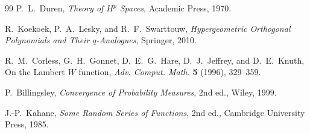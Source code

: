 \documentclass[11pt,a4paper]{article}
\theoremstyle{definition}
\theoremstyle{remark}
\begin{document}
\begin{thebibliography}{99}
P.~L.~Duren,
\emph{Theory of $H^p$ Spaces},
Academic Press, 1970.

R.~Koekoek, P.~A.~Lesky, and R.~F.~Swarttouw,
\emph{Hypergeometric Orthogonal Polynomials and Their $q$-Analogues},
Springer, 2010.

R.~M.~Corless, G.~H.~Gonnet, D.~E.~G.~Hare, D.~J.~Jeffrey, and D.~E.~Knuth,
On the Lambert $W$ function,
\emph{Adv. Comput. Math.} \textbf{5} (1996), 329--359.

P.~Billingsley,
\emph{Convergence of Probability Measures}, 2nd ed.,
Wiley, 1999.

J.-P.~Kahane,
\emph{Some Random Series of Functions}, 2nd ed.,
Cambridge University Press, 1985.

\end{thebibliography}
\end{document}
